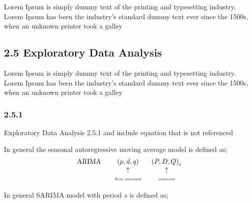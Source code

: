 \documentclass[12pt,]{article}
\begin{document}
Lorem Ipsum is simply dummy text of the printing and typesetting
industry. Lorem Ipsum has been the industry's standard dummy text ever
since the 1500s, when an unknown printer took a galley

\subsection{2.5 Exploratory Data
Analysis}\label{exploratory-data-analysis}

Lorem Ipsum is simply dummy text of the printing and typesetting
industry. Lorem Ipsum has been the industry's standard dummy text ever
since the 1500s, when an unknown printer took a galley

\subsubsection{2.5.1}\label{section-6}

Exploratory Data Analysis 2.5.1 and include equation that is not
referenced

In general the seasonal autoregressive moving average model is defined
as;\\
\[
\begin{array}{*{20}{c}}
{\begin{array}{*{20}{c}}
\text{ARIMA}\\
{}
\end{array}}\\
{}
\end{array}\begin{array}{*{20}{c}}
{\left( {p,d,q} \right)}\\
{\begin{array}{*{20}{c}}
 \uparrow \\
{{\text{\tiny{Non seasonal}}}}
\end{array}}
\end{array}{\rm{ }}\begin{array}{*{20}{c}}
{{{\left( {P,D,Q} \right)}_s}}\\
{\begin{array}{*{20}{c}}
 \uparrow \\
\text{\tiny{seasonal}}
\end{array}}
\end{array}
\]

In general SARIMA model with period \(s\) is defined as;
\end{document}
